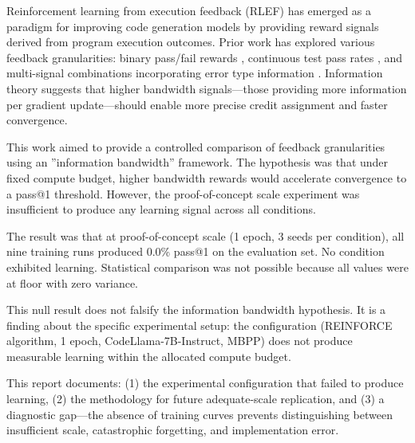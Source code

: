 
Reinforcement learning from execution feedback (RLEF) has emerged as a paradigm for improving code generation models by providing reward signals derived from program execution outcomes. Prior work has explored various feedback granularities: binary pass/fail rewards \citep{le2022coderl}, continuous test pass rates \citep{liu2023rltf}, and multi-signal combinations incorporating error type information \citep{shojaee2023ppocoder}. Information theory suggests that higher bandwidth signals---those providing more information per gradient update---should enable more precise credit assignment and faster convergence.

This work aimed to provide a controlled comparison of feedback granularities using an ''information bandwidth'' framework. The hypothesis was that under fixed compute budget, higher bandwidth rewards would accelerate convergence to a pass@1 threshold. However, the proof-of-concept scale experiment was insufficient to produce any learning signal across all conditions.

The result was that at proof-of-concept scale (1 epoch, 3 seeds per condition), all nine training runs produced 0.0\% pass@1 on the evaluation set. No condition exhibited learning. Statistical comparison was not possible because all values were at floor with zero variance.

This null result does not falsify the information bandwidth hypothesis. It is a finding about the specific experimental setup: the configuration (REINFORCE algorithm, 1 epoch, CodeLlama-7B-Instruct, MBPP) does not produce measurable learning within the allocated compute budget.

This report documents: (1) the experimental configuration that failed to produce learning, (2) the methodology for future adequate-scale replication, and (3) a diagnostic gap---the absence of training curves prevents distinguishing between insufficient scale, catastrophic forgetting, and implementation error.
